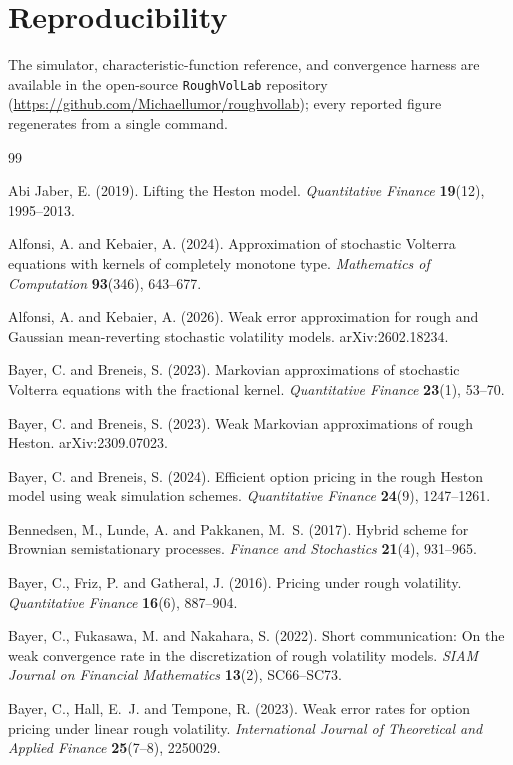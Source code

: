 \documentclass[11pt]{article}
\theoremstyle{plain}
\theoremstyle{definition}
\begin{document}
\section*{Reproducibility}
The simulator, characteristic-function reference, and convergence harness are available in
the open-source \texttt{RoughVolLab} repository
(\url{https://github.com/Michaellumor/roughvollab}); every reported figure regenerates from
a single command.

\begin{thebibliography}{99}

 Abi Jaber, E. (2019).
Lifting the Heston model. \emph{Quantitative Finance} \textbf{19}(12), 1995--2013.

 Alfonsi, A. and Kebaier, A. (2024).
Approximation of stochastic Volterra equations with kernels of completely
monotone type. \emph{Mathematics of Computation} \textbf{93}(346), 643--677.

 Alfonsi, A. and Kebaier, A. (2026).
Weak error approximation for rough and Gaussian mean-reverting stochastic
volatility models. arXiv:2602.18234.

 Bayer, C. and Breneis, S. (2023).
Markovian approximations of stochastic Volterra equations with the fractional kernel.
\emph{Quantitative Finance} \textbf{23}(1), 53--70.

 Bayer, C. and Breneis, S. (2023).
Weak Markovian approximations of rough Heston. arXiv:2309.07023.

 Bayer, C. and Breneis, S. (2024).
Efficient option pricing in the rough Heston model using weak simulation schemes.
\emph{Quantitative Finance} \textbf{24}(9), 1247--1261.

 Bennedsen, M., Lunde, A. and Pakkanen, M.~S. (2017).
Hybrid scheme for Brownian semistationary processes.
\emph{Finance and Stochastics} \textbf{21}(4), 931--965.

 Bayer, C., Friz, P. and Gatheral, J. (2016).
Pricing under rough volatility.
\emph{Quantitative Finance} \textbf{16}(6), 887--904.

 Bayer, C., Fukasawa, M. and Nakahara, S. (2022).
Short communication: On the weak convergence rate in the discretization of
rough volatility models. \emph{SIAM Journal on Financial Mathematics} \textbf{13}(2), SC66--SC73.

 Bayer, C., Hall, E.~J. and Tempone, R. (2023).
Weak error rates for option pricing under linear rough volatility.
\emph{International Journal of Theoretical and Applied Finance} \textbf{25}(7--8), 2250029.


\end{thebibliography}
\end{document}
